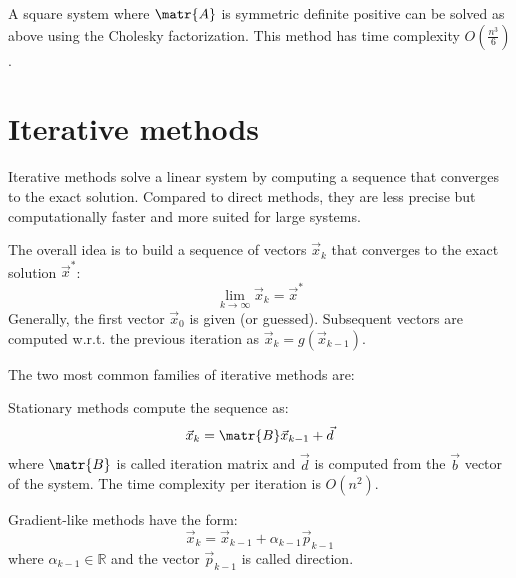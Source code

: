 A square system where $\matr{A}$ is symmetric definite positive can be solved as above using the Cholesky factorization.
This method has time complexity $O(\frac{n^3}{6})$.




\section{Iterative methods}
Iterative methods solve a linear system by computing a sequence that converges to the exact solution.
Compared to direct methods, they are less precise but computationally faster and more suited for large systems. 

The overall idea is to build a sequence of vectors $\vec{x}_k$ 
that converges to the exact solution $\vec{x}^*$:
\[ \lim_{k \rightarrow \infty} \vec{x}_k = \vec{x}^* \]
Generally, the first vector $\vec{x}_0$ is given (or guessed). Subsequent vectors are computed w.r.t. the previous iteration 
as $\vec{x}_k = g(\vec{x}_{k-1})$.

The two most common families of iterative methods are:
\begin{descriptionlist}
    \item[Stationary methods] 
        compute the sequence as:
        \[ \vec{x}_k = \matr{B}\vec{x}_{k-1} + \vec{d} \]
        where $\matr{B}$ is called iteration matrix and $\vec{d}$ is computed from the $\vec{b}$ vector of the system.
        The time complexity per iteration is $O(n^2)$.
    
    \item[Gradient-like methods] 
        have the form:
        \[ \vec{x}_k = \vec{x}_{k-1} + \alpha_{k-1}\vec{p}_{k-1} \]
        where $\alpha_{k-1} \in \mathbb{R}$ and the vector $\vec{p}_{k-1}$ is called direction.
\end{descriptionlist}

